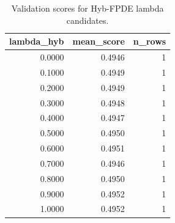 \begin{table}[t]
\caption{Validation scores for Hyb-FPDE lambda candidates.}
\label{tab:lambda_distribution_computed}
\centering
\begin{tabular}{rrr}
\toprule
lambda\_hyb & mean\_score & n\_rows \\
\midrule
0.0000 & 0.4946 & 1 \\
0.1000 & 0.4949 & 1 \\
0.2000 & 0.4949 & 1 \\
0.3000 & 0.4948 & 1 \\
0.4000 & 0.4947 & 1 \\
0.5000 & 0.4950 & 1 \\
0.6000 & 0.4951 & 1 \\
0.7000 & 0.4946 & 1 \\
0.8000 & 0.4950 & 1 \\
0.9000 & 0.4952 & 1 \\
1.0000 & 0.4952 & 1 \\
\bottomrule
\end{tabular}

\end{table}
